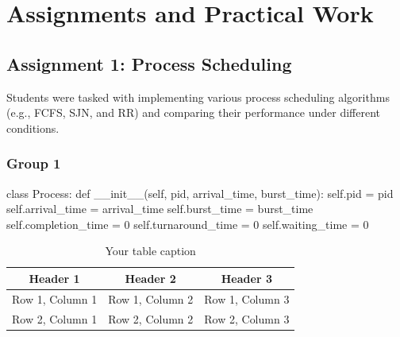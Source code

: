 \documentclass[12pt]{article}
\begin{document}
\section{Assignments and Practical Work}
\subsection{Assignment 1: Process Scheduling}
Students were tasked with implementing various process scheduling algorithms (e.g., FCFS, SJN, and RR) and comparing their performance under different conditions.
\subsubsection{Group 1}
\begin{python}
    class Process:
    def __init__(self, pid, arrival_time, burst_time):
        self.pid = pid
        self.arrival_time = arrival_time
        self.burst_time = burst_time
        self.completion_time = 0
        self.turnaround_time = 0
        self.waiting_time = 0
\end{python}

\begin{table}[htbp] %
    \centering
    \begin{tabular}{|c|c|c|} %
    \hline
    Header 1 & Header 2 & Header 3 \\ %
    \hline
    Row 1, Column 1 & Row 1, Column 2 & Row 1, Column 3 \\ %
    \hline
    Row 2, Column 1 & Row 2, Column 2 & Row 2, Column 3 \\ %
    \hline
    \end{tabular}
    \caption{Your table caption} %
    \label{tab:your_label} %
\end{table}
\end{document}

